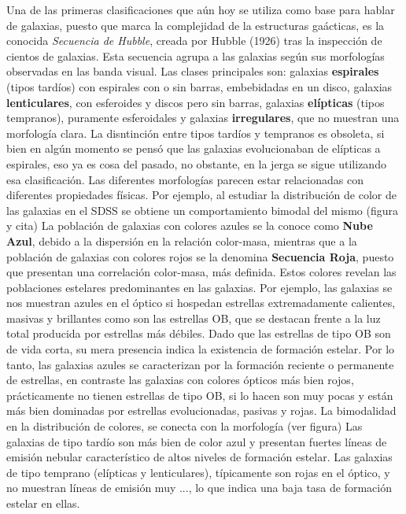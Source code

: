 Una de las primeras clasificaciones que a\'un hoy se utiliza como base para hablar
de galaxias, puesto que marca la complejidad de la estructuras ga\'acticas, 
es la conocida {\it Secuencia de Hubble}, creada por Hubble (1926) tras la inspecci\'on
de cientos de galaxias. Esta secuencia agrupa a las galaxias
seg\'un sus morfolog\'ias observadas en las banda visual.
Las clases principales son:
galaxias {\bf espirales} (tipos tard\'ios) con espirales con o sin barras, embebidadas en un disco,
galaxias {\bf lenticulares}, con esferoides y discos pero sin barras, galaxias {\bf el\'ipticas} (tipos tempranos),
puramente esferoidales y galaxias
{\bf irregulares}, que no muestran una morfolog\'ia clara.
La disntinci\'on entre tipos tard\'ios y tempranos es obsoleta, si bien en alg\'un momento
se pens\'o que las galaxias evolucionaban de el\'ipticas a espirales, eso ya es cosa del
pasado, no obstante, en la jerga se sigue utilizando esa clasificaci\'on. 
Las diferentes morfolog\'ias parecen estar relacionadas con 
diferentes propiedades f\'isicas. Por ejemplo, al estudiar la distribuci\'on
de color de las galaxias en el SDSS se obtiene un comportamiento bimodal del mismo (figura y cita)
La poblaci\'on de galaxias con colores azules se la conoce como {\bf Nube Azul},
debido a la dispersi\'on en la relaci\'on color-masa, mientras
que a la poblaci\'on de galaxias con colores rojos se la denomina {\bf Secuencia Roja}, puesto
que presentan una correlaci\'on color-masa, m\'as definida.
Estos colores revelan las poblaciones estelares predominantes en las galaxias. Por ejemplo,
las galaxias se nos muestran azules en el \'optico si hospedan estrellas extremadamente calientes,
masivas y brillantes como son las estrellas OB, que se destacan frente a la luz total producida 
por estrellas m\'as d\'ebiles. Dado que las estrellas de tipo OB son de vida corta, su mera
presencia indica la existencia de formaci\'on estelar. Por lo tanto, las galaxias
azules se caracterizan por la formaci\'on reciente o permanente de estrellas, en contraste
las galaxias con colores \'opticos m\'as bien rojos, pr\'acticamente no tienen estrellas
de tipo OB, si lo hacen son muy pocas y est\'an m\'as bien dominadas por estrellas
evolucionadas, pasivas y rojas.
La bimodalidad en la distribuci\'on de colores, se conecta con la morfolog\'ia (ver figura)
Las galaxias de tipo tard\'io son m\'as bien de color azul y presentan fuertes l\'ineas
de emisi\'on nebular caracter\'istico de altos niveles de formaci\'on estelar. Las galaxias
de tipo temprano (el\'ipticas y lenticulares), t\'ipicamente son rojas en el \'optico, y
no muestran l\'ineas de emisi\'on muy ..., lo que indica una baja tasa de formaci\'on estelar en
ellas.

